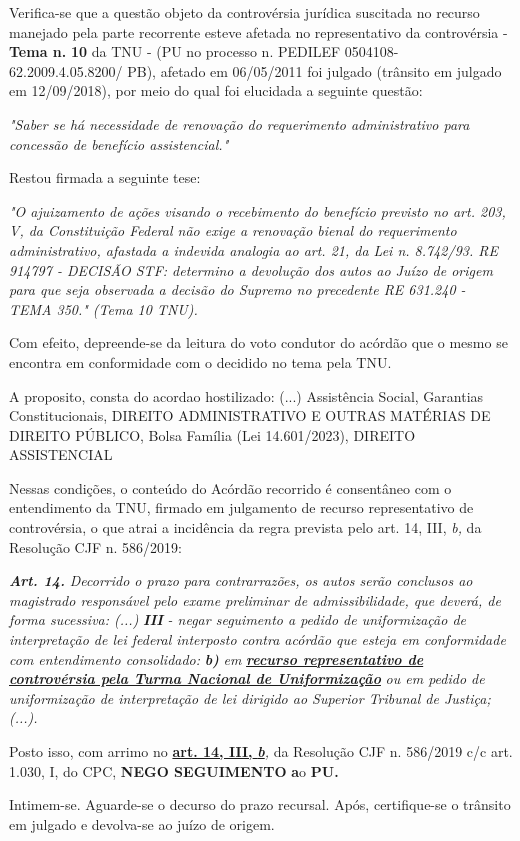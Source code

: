 \documentclass[12pt]{article}
\begin{document}
\justifying
\noindent Verifica-se que a questão objeto da controvérsia jurídica suscitada no recurso manejado pela parte recorrente esteve afetada no representativo da controvérsia - \textbf{Tema n. }\textbf{10} da TNU - (PU no processo n. PEDILEF 0504108- 62.2009.4.05.8200/ PB),  afetado em 06/05/2011 foi julgado (trânsito em julgado em 12/09/2018), por meio do qual foi elucidada a seguinte questão:

\noindent \textit{"Saber se há necessidade de renovação do requerimento administrativo para concessão de benefício assistencial."}

\noindent Restou firmada a seguinte tese:

\noindent \textit{"O ajuizamento de ações visando o recebimento do benefício previsto no art. 203, V, da Constituição Federal não exige a renovação bienal do requerimento administrativo, afastada a indevida analogia ao art. 21, da Lei n. 8.742/93. RE 914797 - DECISÃO STF: determino a devolução dos autos ao Juízo de origem para que seja observada a decisão do Supremo no precedente RE 631.240 - TEMA 350." (Tema 10 TNU).}

\noindent Com efeito, depreende-se da leitura do voto condutor do acórdão que o mesmo se encontra em conformidade com o decidido no  tema pela TNU.

\noindent A proposito, consta do acordao hostilizado: (...) Assistência Social, Garantias Constitucionais, DIREITO ADMINISTRATIVO E OUTRAS MATÉRIAS DE DIREITO PÚBLICO, Bolsa Família (Lei 14.601/2023), DIREITO ASSISTENCIAL

\noindent Nessas condições, o conteúdo do Acórdão recorrido é consentâneo com o entendimento da TNU, firmado em julgamento de recurso representativo de controvérsia, o que atrai a incidência da regra prevista pelo art. 14, III, \textit{b,} da Resolução CJF n. 586/2019:

\noindent \textit{\textbf{Art. 14.}}\textit{ Decorrido o prazo para contrarrazões, os autos serão conclusos ao magistrado responsável pelo exame preliminar de admissibilidade, que deverá, de forma sucessiva: (...) }\textit{\textbf{III }}\textit{- negar seguimento a pedido de uniformização de interpretação de lei federal interposto contra acórdão que esteja em conformidade com entendimento consolidado: }\textit{\textbf{b)}}\textit{ em }\uline{\textit{\textbf{recurso representativo de controvérsia pela Turma Nacional de Uniformização}}}\textit{ ou em pedido de uniformização de interpretação de lei dirigido ao Superior Tribunal de Justiça;(...).}

\noindent Posto isso, com arrimo no \uline{\textbf{art. 14, III, }}\uline{\textit{\textbf{b}}}\textit{,} da Resolução CJF n. 586/2019 c/c art. 1.030, I, do CPC, \textbf{NEGO SEGUIMENTO }\textbf{a}o\textbf{ PU}\textbf{.}

\noindent Intimem-se. Aguarde-se o decurso do prazo recursal. Após, certifique-se o trânsito em julgado e devolva-se ao juízo de origem.
\end{document}
